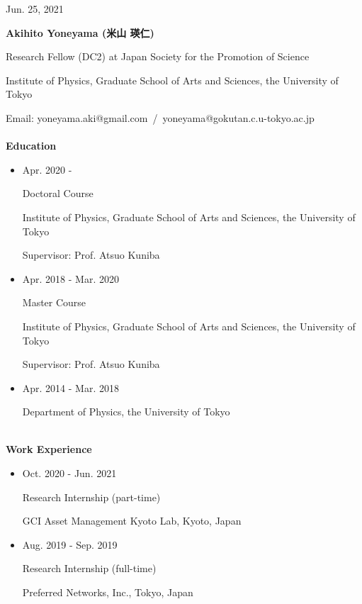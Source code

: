\documentclass[dvipdfmx]{jsarticle}
\begin{document}
%
%
%
%
\begin{flushright}
Jun. 25, 2021
\end{flushright}
%
%
%
%
{\bf\Large Akihito Yoneyama (米山 瑛仁)}
\vspace{3mm}
\par
Research Fellow (DC2) at Japan Society for the Promotion of Science
\par
Institute of Physics, Graduate School of Arts and Sciences, the University of Tokyo
\par
Email: yoneyama.aki@gmail.com{\ }/{\ }yoneyama@gokutan.c.u-tokyo.ac.jp
%
%
%
%
{\ }\\\\
\vspace{3mm}
{\bf\large Education}
\vspace{-6mm}
\\\hrulefill
\begin{itemize}
\item
Apr. 2020 - 
\par
Doctoral Course
\par
Institute of Physics, Graduate School of Arts and Sciences, the University of Tokyo
\par
Supervisor: Prof. Atsuo Kuniba
\item
Apr. 2018 - Mar. 2020
\par
Master Course
\par
Institute of Physics, Graduate School of Arts and Sciences, the University of Tokyo
\par
Supervisor: Prof. Atsuo Kuniba
\item
Apr. 2014 - Mar. 2018
\par
Department of Physics, the University of Tokyo
\end{itemize}
%
%
%
%
{\ }\\
\vspace{3mm}
{\bf\large Work Experience}
\vspace{-6mm}
\\\hrulefill
\begin{itemize}
\item
Oct. 2020 - Jun. 2021
\par
Research Internship (part-time)
\par
GCI Asset Management Kyoto Lab, Kyoto, Japan
%
%
\item
Aug. 2019 - Sep. 2019
\par
Research Internship (full-time)
\par
Preferred Networks, Inc., Tokyo, Japan
\end{itemize}
\end{document}

